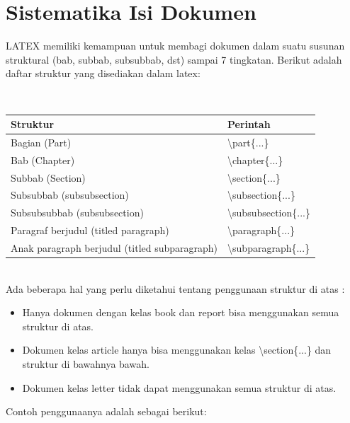 \section{Sistematika Isi Dokumen}
\begin{raggedleft} LATEX memiliki kemampuan untuk membagi dokumen dalam suatu susunan struktural (bab, subbab, subsubbab, dst) sampai 7 tingkatan. Berikut adalah daftar struktur yang disediakan dalam latex:\end{raggedleft}\\[0.5 cm]
\begin{tabular}{|p{10 cm}|p{3.5 cm}|}
\hline
Struktur&Perintah\\ \hline
Bagian (Part)&\textbackslash part\{...\}\\
Bab (Chapter)&\textbackslash chapter\{...\}\\
Subbab (Section)&\textbackslash section\{...\}\\
Subsubbab (subsubsection)&\textbackslash subsection\{...\}\\
Subsubsubbab (subsubsection)&\textbackslash subsubsection\{...\}\\
Paragraf berjudul (titled paragraph)&\textbackslash paragraph\{...\}\\
Anak paragraph berjudul (titled subparagraph)&\textbackslash subparagraph\{...\}\\
\hline
\end{tabular}\\[0.5 cm]
Ada beberapa hal yang perlu diketahui tentang penggunaan struktur di atas :\\
\begin{itemize}
\item Hanya dokumen dengan kelas book dan report bisa menggunakan semua struktur di atas.
\item  Dokumen kelas article hanya bisa menggunakan kelas \textbackslash section\{...\} dan struktur di bawahnya bawah.
\item  Dokumen kelas letter tidak dapat menggunakan semua struktur di atas.
\end{itemize}
Contoh penggunaanya adalah sebagai berikut:\\
